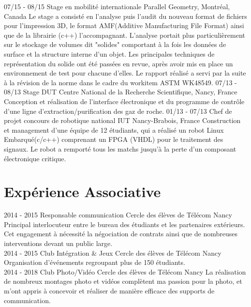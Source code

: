 \documentclass[]{friggeri-cv}
\begin{document}
\begin{entrylist}
  \entry
    {07/15 - 08/15}
    {Stage en mobilité internationale}
    {Parallel Geometry, Montréal, Canada}
    {Le stage a consisté en l'analyse puis l'audit du nouveau format de fichiers pour l'impression 3D, le format AMF(Additive Manufacturing File Format) ainsi que de la librairie (c++) l'accompagnant. L'analyse portait plus particulièrement sur le stockage de volumes dit "solides" comportant à la fois les données de surface et la structure interne d'un objet. Les principales techniques de représentation du solide ont été passées en revue, après avoir mis en place un environnement de test pour chacune d'elles. Le rapport réalisé a servi par la suite à la révision de la norme dans le cadre du workitem ASTM WK48549\cite{AMF}.}
  \entry
    {07/13 - 08/13}
    {Stage DUT}
    {Centre National de la Recherche Scientifique, Nancy, France}
    {Conception et réalisation de l'interface électronique et du programme de contrôle d'une ligne d'extraction/purification des gaz de roche.}
  \entry
    {01/13 - 07/13}
    {Chef de projet concours de robotique national}
    {IUT Nancy-Brabois, France}
    {Construction et management d'une équipe de 12 étudiants, qui a réalisé un robot Linux Embarqué(c/c++) comprenant un FPGA (VHDL) pour le traitement des signaux. Le robot a remporté tous les matchs jusqu'à la perte d'un composant électronique critique.}
\end{entrylist}
\newpage
\section{Expérience Associative}
\begin{entrylist}
  \entry
  {2014 - 2015}
  {Responsable communication}
  {Cercle des élèves de Télécom Nancy}
  {Principal interlocuteur entre le bureau des étudiants et les partenaires extérieurs. Cet engagement à  nécessité la négociation de contrats ainsi que de nombreuses interventions devant un public large.\\}
  \entry
  {2014 - 2015}
  {Club Intégration \& Jeux}
  {Cercle des élèves de Télécom Nancy}
  {Organisation d'événements regroupant plus de 150 étudiants.\\}
  \entry
  {2014 - 2018}
  {Club Photo/Vidéo}
  {Cercle des élèves de Télécom Nancy}
  {La réalisation de nombreux montages photo et vidéos complètent ma passion pour la photo, et m'ont appris à concevoir et réaliser de manière efficace des supports de communication.\\}
\end{entrylist}
\end{document}
